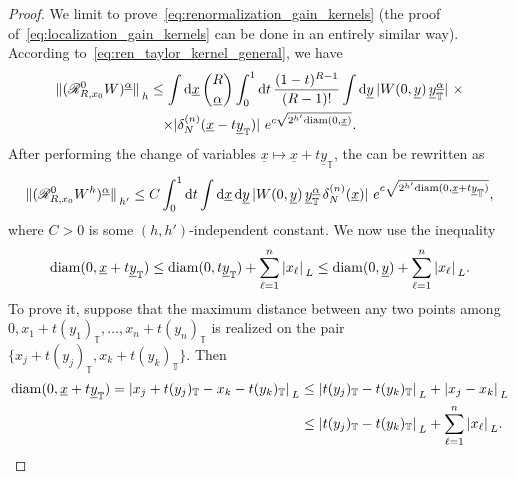 \documentclass[a4paper, 11pt]{article}
\newcommand{\sing}[2]{{#1}^{#2}}							%
\newcommand{\kren}{\mathscr{R}}								%
\newcommand{\torus}{{\scriptstyle{\mathbb{T}}}}				%
\theoremstyle{thm}
\begin{document}
\begin{proof}
We limit to prove~\eqref{eq:renormalization_gain_kernels} (the proof of~\eqref{eq:localization_gain_kernels} can be done in an entirely similar way). According to~\eqref{eq:ren_taylor_kernel_general}, we have
\begin{multline}
\norm*{(\kren_{R, x_0}^0 W)^{\underline{\alpha}}}_h \le \int \dd{\underline{x}} \binom{R}{\underline{\alpha}} \int_0^1 \dd{t} \frac{(1-t)^{R-1}}{(R-1)!} \int \dd{\underline{y}} \abs*{W(0, \underline{y}) \, \underline{y}^{\underline{\alpha}}_\torus} \, \times \\
\times \abs*{\delta^{(n)}_N(\underline{x} - t \underline{y}_\torus)} \, e^{c \sqrt{2^{h'} \mathrm{diam}(0, \underline{x})}}.
\end{multline}
After performing the change of variables $\underline{x} \mapsto \underline{x} + t \underline{y}_\torus$, the can be rewritten as
\begin{equation}
\label{eq:lm:renormalization_gain_quasi_final}
\norm*{(\kren_{R, x_0}^0 \sing{W}{h})^{\underline{\alpha}}}_{h'} \le C \int_0^1 \dd{t} \int \dd{\underline{x}} \dd{\underline{y}} \abs*{W(0, \underline{y}) \, \underline{y}^{\underline{\alpha}}_\torus \, \delta^{(n)}_N(\underline{x})} \, e^{c \sqrt{2^{h'}\mathrm{diam}(0, \underline{x} + t \underline{y}_\torus)}},
\end{equation}
where $C > 0$ is some $(h, h')$-independent constant. We now use the inequality
\begin{equation}
\label{eq:diameter_decomposition}
\mathrm{diam}(0, \underline{x} + t \underline{y}_\torus) \le \mathrm{diam}(0, t \underline{y}_\torus) + \sum_{\ell = 1}^n \abs*{x_\ell}_L \le \mathrm{diam}(0, \underline{y}) + \sum_{\ell = 1}^n \abs*{x_\ell}_L.
\end{equation}
To prove it, suppose that the maximum distance between any two points among $0, x_1 + t (y_1)_\torus, \dots, x_n + t (y_n)_\torus$ is realized on the pair $\lbrace x_j + t (y_j)_\torus, x_k + t (y_k)_\torus \rbrace$. Then
\begin{align}
\label{eq:diameter_decomposition_intermediate}
\begin{split}
\mathrm{diam}(0, \underline{x} + t \underline{y}_\torus) = \abs*{x_j + t (y_j)_\torus - x_k - t (y_k)_\torus}_L
& \le \abs*{t(y_j)_\torus - t(y_k)_\torus}_L + \abs*{x_j - x_k}_L \\
& \le \abs*{t(y_j)_\torus - t(y_k)_\torus}_L + \sum_{\ell = 1}^n \abs*{x_\ell}_L.
\end{split}
\end{align}

\end{proof}
\end{document}
